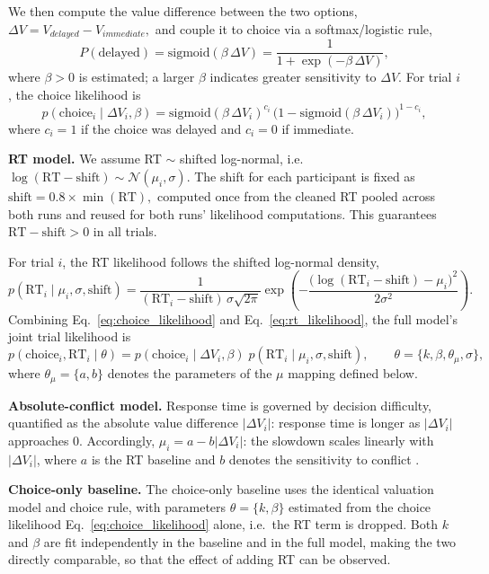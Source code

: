 \documentclass[11pt,a4paper]{article}
\begin{document}
	We then compute the value difference between the two options,
	$\Delta V = V_{delayed}-V_{immediate},$
	and couple it to choice via a softmax/logistic rule, \[ P(\text{delayed}) = \text{sigmoid}(\beta\,\Delta V) = \dfrac{1}{1 + \exp(-\beta\,\Delta V)},\]
	where $\beta>0$ is estimated; a larger $\beta$ indicates greater sensitivity to $\Delta V$. For trial $i$, the choice likelihood is
	\begin{equation}
		p(\text{choice}_i \mid \Delta V_i,\beta) = \text{sigmoid}(\beta\,\Delta V_i)^{c_i}\,\big(1-\text{sigmoid}(\beta\,\Delta V_i)\big)^{1-c_i},
		\label{eq:choice_likelihood}
	\end{equation}
	where $c_i=1$ if the choice was delayed and $c_i=0$ if immediate.
	
	\textbf{RT model.} We assume RT $\sim$ shifted log-normal, i.e.\ $\log(\text{RT}-\text{shift}) \sim \mathcal{N}(\mu_i,\sigma)$.
	The shift for each participant is fixed as
	$\text{shift} = 0.8 \times \min(\text{RT}),$
	computed once from the cleaned RT pooled across both runs and reused for both runs' likelihood computations. This guarantees $\text{RT}-\text{shift}>0$ in all trials.
	
	For trial $i$, the RT likelihood follows the shifted log-normal density,
	\begin{equation}
		p(\text{RT}_i \mid \mu_i,\sigma,\text{shift}) = \frac{1}{(\text{RT}_i-\text{shift})\,\sigma\sqrt{2\pi}} \exp\!\left(-\frac{\big(\log(\text{RT}_i-\text{shift})-\mu_i\big)^2}{2\sigma^2}\right).
		\label{eq:rt_likelihood}
	\end{equation}
	Combining Eq.~\eqref{eq:choice_likelihood} and Eq.~\eqref{eq:rt_likelihood}, the full model's joint trial likelihood is
	\begin{equation*}
		p(\text{choice}_i,\text{RT}_i \mid \theta) = p(\text{choice}_i\mid\Delta V_i,\beta)\; p(\text{RT}_i\mid\mu_i,\sigma,\text{shift}), \qquad \theta=\{k,\beta,\theta_{\mu},\sigma\},
	\end{equation*}
	where $\theta_\mu=\{a,b\}$ denotes the parameters of the $\mu$ mapping defined below.
	
	\textbf{Absolute-conflict model.} Response time is governed by decision difficulty, quantified as the absolute value difference $|\Delta V_i|$: response time is longer as $|\Delta V_i|$ approaches 0. Accordingly, $\mu_i = a-b|\Delta V_i|$: the slowdown scales linearly with $|\Delta V_i|$, where $a$ is the RT baseline and $b$ denotes the sensitivity to conflict \cite{mormann2010drift}.
	
	\textbf{Choice-only baseline.}
	The choice-only baseline uses the identical valuation model and choice rule, with parameters $\theta=\{k,\beta\}$ estimated from the choice likelihood Eq.~\eqref{eq:choice_likelihood} alone, i.e.\ the RT term is dropped. Both $k$ and $\beta$ are fit independently in the baseline and in the full model, making the two directly comparable, so that the effect of adding RT can be observed.
	
\end{document}
